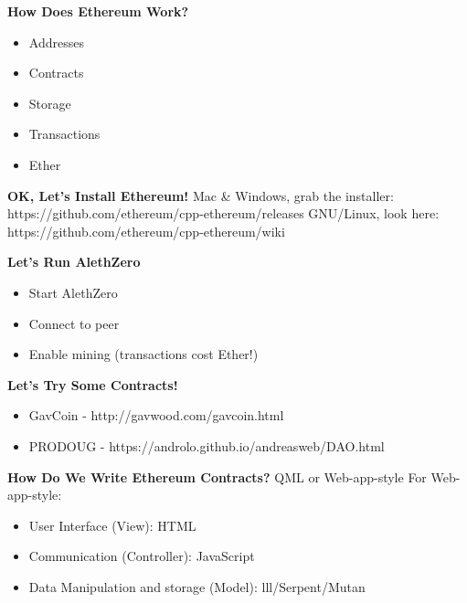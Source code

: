 \documentclass{beamer}
\begin{document}
\begin{frame}
\textbf{How Does Ethereum Work?}
\begin{itemize}
  \item{Addresses}
  \item{Contracts}
  \item{Storage}
  \item{Transactions}
  \item{Ether}
\end{itemize}
\end{frame}


\begin{frame}
\textbf{OK, Let's Install Ethereum!}
\newline{} \newline{}
Mac \& Windows, grab the installer:
\newline{}
https://github.com/ethereum/cpp-ethereum/releases
\newline{} \newline{}
GNU/Linux, look here:
\newline{}
https://github.com/ethereum/cpp-ethereum/wiki
\end{frame}


\begin{frame}
\textbf{Let's Run AlethZero}
\begin{itemize}
  \item{Start AlethZero}
  \item{Connect to peer}
  \item{Enable mining (transactions cost Ether!)}
\end{itemize}
\end{frame}


\begin{frame}
\textbf{Let's Try Some Contracts!}
\begin{itemize}
  \item{GavCoin - http://gavwood.com/gavcoin.html}
  \item{PRODOUG - https://androlo.github.io/andreasweb/DAO.html}
\end{itemize}
\end{frame}


\begin{frame}
\textbf{How Do We Write Ethereum Contracts?}
\newline{}
QML or Web-app-style
\newline{}
For Web-app-style:
\begin{itemize}
  \item{User Interface (View): HTML}
  \item{Communication (Controller): JavaScript}
  \item{Data Manipulation and storage (Model): lll/Serpent/Mutan}
\end{itemize}
\end{frame}
\end{document}

